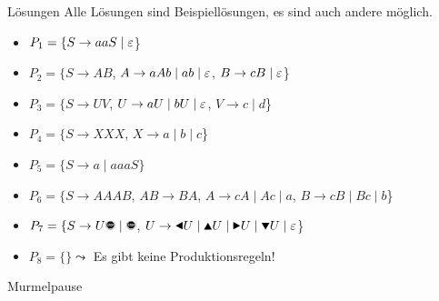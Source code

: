 {
\begin{frame}{Lösungen}
Alle Lösungen sind Beispiellösungen, es sind auch andere möglich.
    \begin{itemize}
        \item<1-> \alert<1>{$P_1 = \{S\rightarrow aaS\;|\;\varepsilon$\}}
        \item<2-> \alert<2>{$P_2 = \{S\rightarrow AB$, $A\rightarrow aAb \;|\; ab\; |\;\varepsilon$, $B\rightarrow cB \;|\; \varepsilon$\}}
        \item<3-> \alert<3>{$P_3 = \{S\rightarrow UV$, $U\rightarrow aU \;|\; bU \; |\; \varepsilon$, $V\rightarrow c \;|\; d$\}}
        \item<4-> \alert<4>{$P_4 = \{S\rightarrow XXX$, $X\rightarrow a \;|\; b \;|\; c$\}}
        \item<5-> \alert<5>{$P_5 = \{S\rightarrow a \;|\; aaaS\}$}
        \item<6-> \alert<6>{$P_6 = \{S\rightarrow AAAB$, $AB\rightarrow BA$, 
        $A\rightarrow cA \;|\; Ac \;|\; a$, 
        $B\rightarrow cB \;|\; Bc \;|\; b$\}}
        \item<7-> \alert<7>{$P_7 = \{S\rightarrow U\text{\Stopsign} \;|\; \text{\Stopsign}$, $U\rightarrow \text{\Rewind} U \;|\; \text{\MoveUp} U \;|\; \text{\Forward} U \;|\; \text{\MoveDown} U \;|\;\emptyWord$\}}
        \item<8-> \alert<8>{$P_8 = \{\} \leadsto$ Es gibt keine Produktionsregeln!}
    \end{itemize}
\end{frame}
}  

\begin{frame}[standout]
  Murmelpause
\end{frame}

